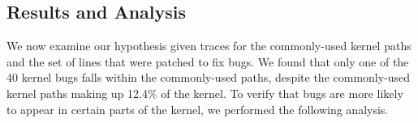 \subsection{Results and Analysis}
\label{Verification-of-Hypothesis}


%
%


%
%
We now examine our hypothesis given traces for the commonly-used kernel
paths and the set of lines that were patched to fix bugs. We found that
only one of the 40 kernel bugs falls within the commonly-used paths, despite
the commonly-used kernel paths making up 12.4\% of the kernel.
To verify that bugs are more likely to appear in certain parts of 
the kernel, we performed the following analysis.

